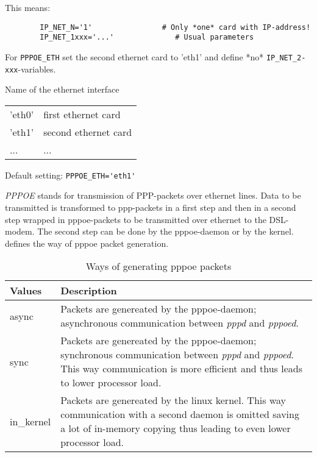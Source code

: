 This means:

\begin{example}
\begin{verbatim}
        IP_NET_N='1'                # Only *one* card with IP-address!
        IP_NET_1xxx='...'              # Usual parameters
\end{verbatim}
\end{example}

For \verb*?PPPOE_ETH? set the second ethernet card to 'eth1' and
define *no* \verb*?IP_NET_2-xxx?-variables.

\begin{description}
 


Name of the ethernet interface

\begin{tabular}[h!]{ll}
  'eth0' & first ethernet card\\
  'eth1' & second ethernet card\\
  ...   &  ...\\
\end{tabular}
            
Default setting: \verb*?PPPOE_ETH='eth1'?


\emph{PPPOE} stands for transmission of PPP-packets over
ethernet lines. Data to be transmitted is transformed to ppp-packets
in a first step and then in a second step wrapped in pppoe-packets 
to be transmitted over ethernet to the DSL-modem. The second 
step can be done by the pppoe-daemon or by the kernel. 
 defines the way of pppoe packet generation.

\begin{table}[h!]
  \centering
  \begin{tabular}{|l|p{10cm}|}
    \hline
    Values & Description \\
    \hline
    async & Packets are genereated by the pppoe-daemon; 
    asynchronous communication between \emph{pppd} and \emph{pppoed}. \\
    sync & Packets are genereated by the pppoe-daemon; 
    synchronous communication between \emph{pppd} and \emph{pppoed}. 
    This way communication is more efficient and thus leads to
    lower processor load. \\
    in\_kernel & Packets are genereated by the linux kernel. This way 
    communication with a second daemon is omitted saving a lot of
    in-memory copying thus leading to even lower processor load. \\
    \hline
  \end{tabular}
  \caption{Ways of generating pppoe packets}
  \label{tab:pppoe-type}
\end{table}


\end{description}
